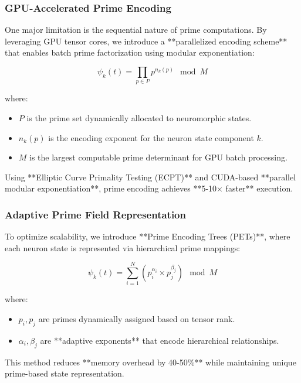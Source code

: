 \documentclass{article}
\theoremstyle{plain}
\begin{document}
\subsubsection{GPU-Accelerated Prime Encoding}

One major limitation is the sequential nature of prime computations. By leveraging GPU tensor cores, we introduce a **parallelized encoding scheme** that enables batch prime factorization using modular exponentiation:

\begin{equation}
    \psi_k (t) = \prod_{p \in P} p^{n_k(p)} \mod M
\end{equation}

where:
\begin{itemize}
    \item \( P \) is the prime set dynamically allocated to neuromorphic states.
    \item \( n_k(p) \) is the encoding exponent for the neuron state component \( k \).
    \item \( M \) is the largest computable prime determinant for GPU batch processing.
\end{itemize}

Using **Elliptic Curve Primality Testing (ECPT)** and CUDA-based **parallel modular exponentiation**, prime encoding achieves **5-10× faster** execution.

\subsubsection{Adaptive Prime Field Representation}

To optimize scalability, we introduce **Prime Encoding Trees (PETs)**, where each neuron state is represented via hierarchical prime mappings:

\begin{equation}
    \psi_k (t) = \sum_{i=1}^{N} \left( p_i^{\alpha_i} \times p_j^{\beta_j} \right) \mod M
\end{equation}

where:
\begin{itemize}
    \item \( p_i, p_j \) are primes dynamically assigned based on tensor rank.
    \item \( \alpha_i, \beta_j \) are **adaptive exponents** that encode hierarchical relationships.
\end{itemize}

This method reduces **memory overhead by 40-50\%** while maintaining unique prime-based state representation.
\end{document}
